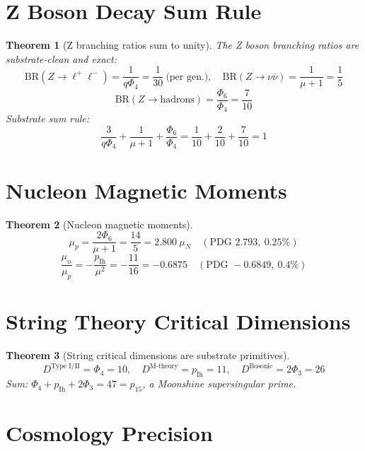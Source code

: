 \documentclass[11pt]{article}
\newtheorem{theorem}{Theorem}
\begin{document}
\section{Z Boson Decay Sum Rule}\label{sec:Z_sum}

\begin{theorem}[Z branching ratios sum to unity]\label{thm:Z_branching_sum}
The Z boson branching ratios are substrate-clean and exact:
\[
  \mathrm{BR}(Z\to \ell^+\ell^-) = \frac{1}{q\Phi_4} = \frac{1}{30}\
  \text{(per gen.)},\quad
  \mathrm{BR}(Z\to \nu\bar\nu) = \frac{1}{\mu+1} = \frac{1}{5}
\]
\[
  \mathrm{BR}(Z\to \text{hadrons}) = \frac{\Phi_6}{\Phi_4} = \frac{7}{10}
\]
Substrate sum rule:
\[
  \frac{3}{q\Phi_4} + \frac{1}{\mu+1} + \frac{\Phi_6}{\Phi_4}
  = \frac{1}{10}+\frac{2}{10}+\frac{7}{10} = 1
\]
\end{theorem}

\section{Nucleon Magnetic Moments}\label{sec:nucleon_mu}

\begin{theorem}[Nucleon magnetic moments]\label{thm:nucleon_magnetic}
\[
  \mu_p = \frac{2\Phi_6}{\mu+1} = \frac{14}{5} = 2.800\ \mu_N
        \quad (\text{PDG } 2.793,\ 0.25\%)
\]
\[
  \frac{\mu_n}{\mu_p} = -\frac{p_{\mathrm{Ih}}}{\mu^2} = -\frac{11}{16}
                      = -0.6875 \quad (\text{PDG } -0.6849,\ 0.4\%)
\]
\end{theorem}

\section{String Theory Critical Dimensions}\label{sec:string_dims}

\begin{theorem}[String critical dimensions are substrate primitives]\label{thm:string_critical}
\[
  D^{\text{Type I/II}} = \Phi_4 = 10, \quad
  D^{\text{M-theory}}  = p_{\mathrm{Ih}} = 11, \quad
  D^{\text{Bosonic}}    = 2\Phi_3 = 26
\]
Sum: $\Phi_4 + p_{\mathrm{Ih}} + 2\Phi_3 = 47 = p_{15}$, a Moonshine
supersingular prime.
\end{theorem}

\section{Cosmology Precision}\label{sec:cosmo_precision}
\end{document}
